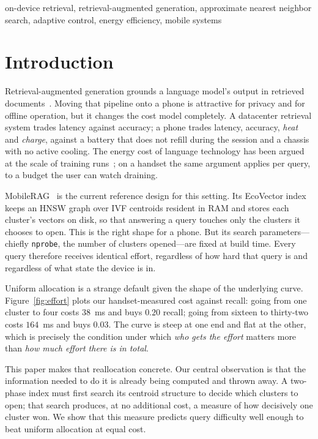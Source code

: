 \documentclass[conference]{IEEEtran}
\begin{document}
\begin{IEEEkeywords}
on-device retrieval, retrieval-augmented generation, approximate nearest
neighbor search, adaptive control, energy efficiency, mobile systems
\end{IEEEkeywords}

\section{Introduction}

Retrieval-augmented generation grounds a language model's output in retrieved
documents~\cite{lewis2020rag,gao2023ragsurvey}. Moving that pipeline onto a
phone is attractive for privacy and for offline operation, but it changes the
cost model completely. A datacenter retrieval system trades latency against
accuracy; a phone trades latency, accuracy, \emph{heat} and \emph{charge},
against a battery that does not refill during the session and a chassis with no
active cooling. The energy cost of language technology has been argued at the
scale of training runs~\cite{strubell2019energy,schwartz2020greenai}; on a
handset the same argument applies per query, to a budget the user can watch
draining.

MobileRAG~\cite{park2025mobilerag} is the current reference design for this
setting. Its EcoVector index keeps an HNSW graph over IVF centroids resident in
RAM and stores each cluster's vectors on disk, so that answering a query touches
only the clusters it chooses to open. This is the right shape for a phone. But
its search parameters---chiefly \texttt{nprobe}, the number of clusters
opened---are fixed at build time. Every query therefore receives identical
effort, regardless of how hard that query is and regardless of what state the
device is in.

Uniform allocation is a strange default given the shape of the underlying
curve. Figure~\ref{fig:effort} plots our handset-measured cost against recall:
going from one cluster to four costs $38$~ms and buys $0.20$ recall; going from
sixteen to thirty-two costs $164$~ms and buys $0.03$. The curve is steep at one
end and flat at the other, which is precisely the condition under which
\emph{who gets the effort} matters more than \emph{how much effort there is in
total}.

This paper makes that reallocation concrete. Our central observation is that
the information needed to do it is already being computed and thrown away. A
two-phase index must first search its centroid structure to decide which
clusters to open; that search produces, at no additional cost, a measure of how
decisively one cluster won. We show that this measure predicts query difficulty
well enough to beat uniform allocation at equal cost.
\end{document}
